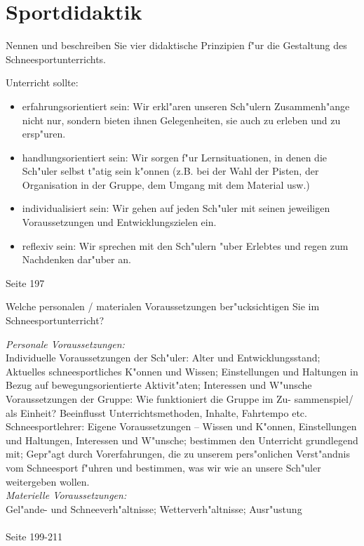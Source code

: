 \section{Sportdidaktik}
\begin{question}{4}
Nennen und beschreiben Sie vier didaktische Prinzipien f"ur die Gestaltung des Schneesportunterrichts.
\end{question}
\begin{solution}
Unterricht sollte:
\begin{itemize}
\item erfahrungsorientiert sein: Wir erkl"aren unseren Sch"ulern Zusammenh"ange nicht nur, sondern bieten ihnen Gelegenheiten, sie auch zu erleben und zu ersp"uren.
\item handlungsorientiert sein: Wir sorgen f"ur Lernsituationen, in denen die Sch"uler selbst t"atig sein k"onnen (z.B. bei der Wahl der Pisten, der Organisation in der Gruppe, dem Umgang mit dem Material usw.)
\item individualisiert sein: Wir gehen auf jeden Sch"uler mit seinen jeweiligen Voraussetzungen und Entwicklungszielen ein.
\item reflexiv sein: Wir sprechen mit den Sch"ulern "uber Erlebtes und regen zum Nachdenken dar"uber an.
\end{itemize}
 Seite 197
\end{solution}

\begin{question}{3}
Welche personalen / materialen Voraussetzungen ber"ucksichtigen Sie im Schneesportunterricht? 
\end{question}
\begin{solution}
\emph{Personale Voraussetzungen:}\\
Individuelle Voraussetzungen der Sch"uler: Alter und Entwicklungsstand; Aktuelles schneesportliches K"onnen und Wissen; Einstellungen und Haltungen in Bezug auf bewegungsorientierte Aktivit"aten; Interessen und W"unsche\\
Voraussetzungen der Gruppe: Wie funktioniert die Gruppe im Zu- sammenspiel/ als Einheit? Beeinflusst Unterrichtsmethoden, Inhalte, Fahrtempo etc.\\
Schneesportlehrer: Eigene Voraussetzungen – Wissen und K"onnen, Einstellungen und Haltungen, Interessen und W"unsche; bestimmen den Unterricht grundlegend mit; Gepr"agt durch Vorerfahrungen, die zu unserem pers"onlichen Verst"andnis vom Schneesport f"uhren und bestimmen, was wir wie an unsere Sch"uler weitergeben wollen.\\
\emph{Materielle Voraussetzungen:}\\
Gel"ande- und Schneeverh"altnisse; Wetterverh"altnisse; Ausr"ustung\\\\
 Seite 199-211
\end{solution}


